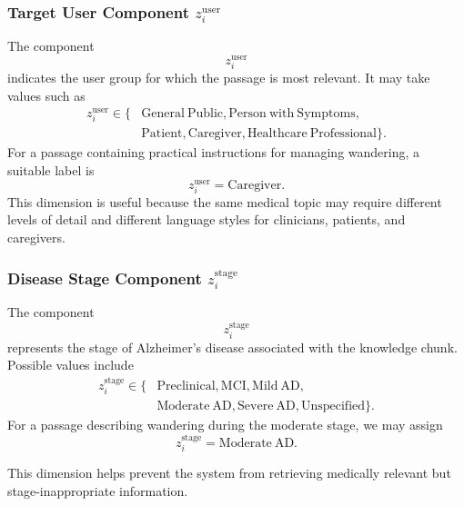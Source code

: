 \documentclass{article}
\begin{document}
\subsubsection{Target User Component $z_i^{\mathrm{user}}$}
The component
\begin{equation}
    z_i^{\mathrm{user}}
\end{equation}
indicates the user group for which the passage is most relevant.
It may take values such as
\begin{equation}
\begin{split}
    z_i^{\mathrm{user}} \in
    \{&
    \mathrm{General\ Public},
    \mathrm{Person\ with\ Symptoms},\\
    &\mathrm{Patient},
    \mathrm{Caregiver},
    \mathrm{Healthcare\ Professional}
    \}.
\end{split}
\end{equation}
For a passage containing practical instructions for managing wandering, a suitable label is
\begin{equation}
    z_i^{\mathrm{user}} = \mathrm{Caregiver}.
\end{equation}
This dimension is useful because the same medical topic may require different levels of detail and different language styles for clinicians, patients, and caregivers.

\subsubsection{Disease Stage Component $z_i^{\mathrm{stage}}$}
The component
\begin{equation}
    z_i^{\mathrm{stage}}
\end{equation}
represents the stage of Alzheimer's disease associated with the knowledge chunk.
Possible values include
\begin{equation}
\begin{split}
    z_i^{\mathrm{stage}} \in
    \{&
    \mathrm{Preclinical},
    \mathrm{MCI},
    \mathrm{Mild\ AD},\\
    &\mathrm{Moderate\ AD},
    \mathrm{Severe\ AD},
    \mathrm{Unspecified}
    \}.
\end{split}
\end{equation}
For a passage describing wandering during the moderate stage, we may assign
\begin{equation}
    z_i^{\mathrm{stage}} = \mathrm{Moderate\ AD}.
\end{equation}

This dimension helps prevent the system from retrieving medically relevant but stage-inappropriate information.
\end{document}
